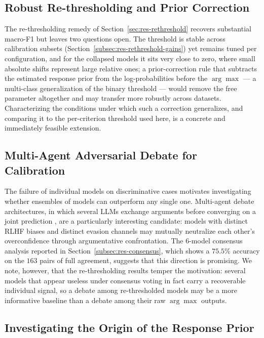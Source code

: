 \subsection{Robust Re-thresholding and Prior Correction}
\label{subsec:conc-rethreshold}

The re-thresholding remedy of Section~\ref{sec:res-rethreshold} 
recovers substantial macro-F1 but leaves two questions open. The 
threshold is stable across calibration subsets 
(Section~\ref{subsec:res-rethreshold-gains}) yet remains tuned per 
configuration, and for the collapsed models it sits very close to zero, 
where small absolute shifts represent large relative ones; a 
prior-correction rule that subtracts the estimated response prior from 
the log-probabilities before the $\arg\max$ --- a multi-class 
generalization of the binary threshold --- would remove the free 
parameter altogether and may transfer more robustly across datasets. 
Characterizing the conditions under which such a correction generalizes, 
and comparing it to the per-criterion threshold used here, is a concrete 
and immediately feasible extension.

\subsection{Multi-Agent Adversarial Debate for Calibration}
\label{subsec:conc-debate}

The failure of individual models on discriminative cases motivates 
investigating whether ensembles of models can outperform any single 
one. Multi-agent debate architectures, in which several LLMs exchange 
arguments before converging on a joint prediction 
\cite{ouyang2022training}, are a particularly interesting candidate: 
models with distinct RLHF biases and distinct evasion channels may 
mutually neutralize each other's overconfidence through argumentative 
confrontation. The 6-model consensus analysis reported in 
Section~\ref{subsec:res-consensus}, which shows a $75.5\%$ accuracy on 
the $163$ pairs of full agreement, suggests that this direction is 
promising. We note, however, that the re-thresholding results temper the 
motivation: several models that appear useless under consensus voting 
in fact carry a recoverable individual signal, so a debate among 
re-thresholded models may be a more informative baseline than a debate 
among their raw $\arg\max$ outputs.

\subsection{Investigating the Origin of the Response Prior}
\label{subsec:conc-collapse-origin}

